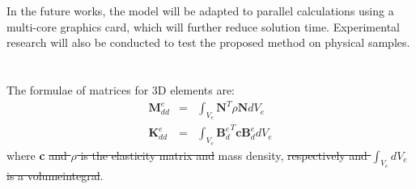 \documentclass[materials,article,submit,moreauthors,pdftex]{Definitions/mdpi}
\providecommand{\DIFadd}[1]{{\protect\color{blue}{#1}}} %
\providecommand{\DIFdel}[1]{{\protect\color{red}\sout{#1}}}                      %
\providecommand{\DIFaddbegin}{} %
\providecommand{\DIFaddend}{} %
\providecommand{\DIFdelbegin}{} %
\providecommand{\DIFdelend}{} %
\begin{document}
In the future works, the model will be adapted to parallel calculations using a multi-core graphics card, which will further reduce solution time. Experimental research will also be conducted to test the proposed method on physical samples.

\appendix
\section{}
\label{app:matrices}
The formulae of matrices for 3D elements are:
\begin{eqnarray}
\textbf{M}_{dd}^e & = & \int_{V_e}\textbf{N}^T\rho \textbf{N} dV_e\\
\textbf{K}_{dd}^e & = & \int_{V_e}{\textbf{B}_d^e}^T\textbf{c}\textbf{B}_d^edV_e
\end{eqnarray}
where \textbf{c} \DIFdelbegin \DIFdel{and \(\rho\) is the elasticity matrix and }\DIFdelend \DIFaddbegin \DIFadd{is the stiffness tensor, \(\rho\) is }\DIFaddend mass density, \DIFdelbegin \DIFdel{respectively and \(\int_{V_e}dV_e\) is a volumeintegral}\DIFdelend \DIFaddbegin \DIFadd{and \(V_e\) is the element volume}\DIFaddend .
\end{document}
